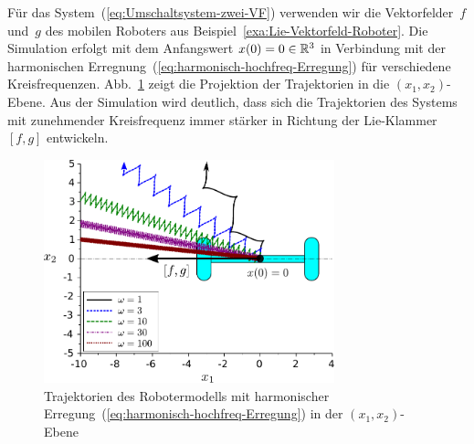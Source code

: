 \begin{example}
Für das System~(\ref{eq:Umschaltsystem-zwei-VF}) verwenden wir die
Vektorfelder~$f$ und~$g$ des mobilen Roboters aus Beispiel~\ref{exa:Lie-Vektorfeld-Roboter}.
Die Simulation erfolgt mit dem Anfangswert $x(0)=0\in{\mathbb{R}}^{3}$ in Verbindung
mit der harmonischen Erregnung~(\ref{eq:harmonisch-hochfreq-Erregung})
für verschiedene Kreisfrequenzen. Abb.~\ref{fig:Trajektorien-Roboter-harmonische-Erregung}
zeigt die Projektion der Trajektorien in die $(x_{1},x_{2})$-Ebene.
Aus der Simulation wird deutlich, dass sich die Trajektorien des Systems
mit zunehmender Kreisfrequenz immer stärker in Richtung der Lie-Klammer
$[f,g]$ entwickeln.
\end{example}
\begin{figure}
\begin{centering}
\includegraphics[width=0.75\textwidth]{roboter-averaging}
\par\end{centering}
\caption{Trajektorien des Robotermodells mit harmonischer Erregung~(\ref{eq:harmonisch-hochfreq-Erregung})
in der $(x_{1},x_{2})$-Ebene\label{fig:Trajektorien-Roboter-harmonische-Erregung}}
\end{figure}

